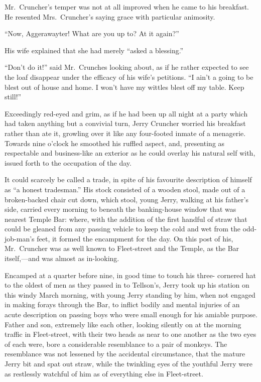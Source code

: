 Mr.\ Cruncher's temper was not at all improved when he came to his
breakfast.  He resented Mrs.\ Cruncher's saying grace with particular
animosity.

``Now, Aggerawayter!  What are you up to?  At it again?''

His wife explained that she had merely ``asked a blessing.''

``Don't do it!'' said Mr.\ Crunches looking about, as if he rather
expected to see the loaf disappear under the efficacy of his wife's
petitions.  ``I ain't a going to be blest out of house and home.
I won't have my wittles blest off my table.  Keep still!''

Exceedingly red-eyed and grim, as if he had been up all night at a
party which had taken anything but a convivial turn, Jerry Cruncher
worried his breakfast rather than ate it, growling over it like any
four-footed inmate of a menagerie.  Towards nine o'clock he smoothed
his ruffled aspect, and, presenting as respectable and business-like
an exterior as he could overlay his natural self with, issued forth
to the occupation of the day.

It could scarcely be called a trade, in spite of his favourite
description of himself as ``a honest tradesman.''  His stock consisted
of a wooden stool, made out of a broken-backed chair cut down, which
stool, young Jerry, walking at his father's side, carried every
morning to beneath the banking-house window that was nearest Temple
Bar:  where, with the addition of the first handful of straw that
could be gleaned from any passing vehicle to keep the cold and wet
from the odd-job-man's feet, it formed the encampment for the day.
On this post of his, Mr.\ Cruncher was as well known to Fleet-street
and the Temple, as the Bar itself,---and was almost as in-looking.

Encamped at a quarter before nine, in good time to touch his three-%
cornered hat to the oldest of men as they passed in to Tellson's,
Jerry took up his station on this windy March morning, with young
Jerry standing by him, when not engaged in making forays through the
Bar, to inflict bodily and mental injuries of an acute description on
passing boys who were small enough for his amiable purpose.  Father
and son, extremely like each other, looking silently on at the
morning traffic in Fleet-street, with their two heads as near to one
another as the two eyes of each were, bore a considerable resemblance
to a pair of monkeys.  The resemblance was not lessened by the
accidental circumstance, that the mature Jerry bit and spat out
straw, while the twinkling eyes of the youthful Jerry were as
restlessly watchful of him as of everything else in Fleet-street.

